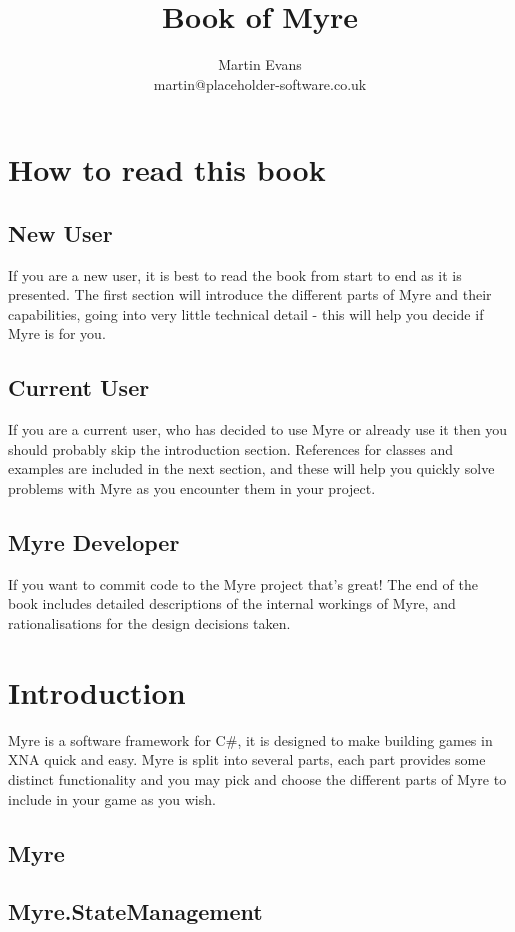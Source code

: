 \documentclass{article}
\title{Book of Myre}
\author{Martin Evans\\martin@placeholder-software.co.uk}
\date{}
\begin{document}
\maketitle

\tableofcontents
\pagebreak[4]

\section{How to read this book}
\subsection{New User}
If you are a new user, it is best to read the book from start to end as it is presented. The first section will introduce the different parts of Myre and their capabilities, going into very little technical detail - this will help you decide if Myre is for you.
\subsection{Current User}
If you are a current user, who has decided to use Myre or already use it then you should probably skip the introduction section. References for classes and examples are included in the next section, and these will help you quickly solve problems with Myre as you encounter them in your project.
\subsection{Myre Developer}
If you want to commit code to the Myre project that's great! The end of the book includes detailed descriptions of the internal workings of Myre, and rationalisations for the design decisions taken.
\pagebreak[4]

\section{Introduction}
Myre is a software framework for C\#, it is designed to make building games in XNA quick and easy. Myre is split into several parts, each part provides some distinct functionality and you may pick and choose the different parts of Myre to include in your game as you wish.
\subsection{Myre}
\subsection{Myre.StateManagement}
\end{document}
